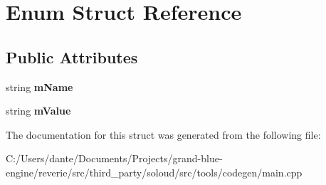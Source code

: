 \hypertarget{struct_enum}{}\section{Enum Struct Reference}
\label{struct_enum}
\subsection*{Public Attributes}
\begin{DoxyCompactItemize}
\item 
\mbox{\label{struct_enum_a5bbdd92621a6591df8ca061043dd8728}} 
string {\bfseries m\+Name}
\item 
\mbox{\label{struct_enum_aee236ed26d68a2107b32966a1d9e0b20}} 
string {\bfseries m\+Value}
\end{DoxyCompactItemize}


The documentation for this struct was generated from the following file\+:\begin{DoxyCompactItemize}
\item 
C\+:/\+Users/dante/\+Documents/\+Projects/grand-\/blue-\/engine/reverie/src/third\+\_\+party/soloud/src/tools/codegen/main.\+cpp\end{DoxyCompactItemize}
